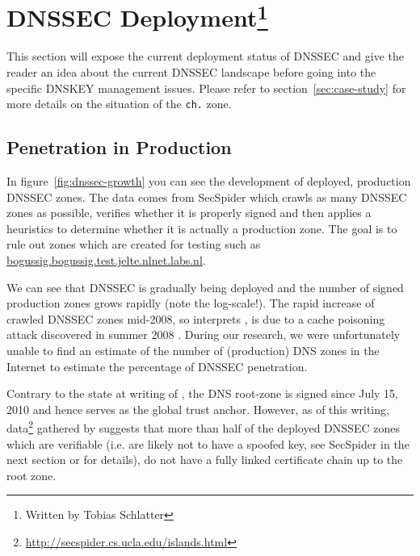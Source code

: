 \documentclass[a4paper,twocolumn]{scrartcl}
\newcommand{\wbts}{\protect\footnote{Written by Tobias Schlatter}}
\begin{document}
\section{DNSSEC Deployment\wbts}

This section will expose the current deployment status of DNSSEC and
give the reader an idea about the current DNSSEC landscape before
going into the specific DNSKEY management issues. Please refer to
section~\ref{sec:case-study} for more details on the situation of the
\verb|ch.| zone.

\subsection{Penetration in Production}
In figure~\ref{fig:dnssec-growth} you can see the development of
deployed, production DNSSEC zones. The data comes from SecSpider
\cite{secspider} which crawls as many DNSSEC zones as possible,
verifies whether it is properly signed and then applies a heuristics to
determine whether it is actually a production zone. The goal is to
rule out zones which are created for testing such as
\url{bogussig.bogussig.test.jelte.nlnet.labs.nl}.

We can see that DNSSEC is gradually being deployed and the number of
signed production zones grows rapidly (note the log-scale!). The rapid
increase of crawled DNSSEC zones mid-2008, so interprets
\cite{Osterweil09}, is due to a cache poisoning attack discovered in
summer 2008 \cite{dnsVuln}. During our research, we were unfortunately
unable to find an estimate of the number of (production) DNS zones in
the Internet to estimate the percentage of DNSSEC penetration.

Contrary to the state at writing of \cite{Osterweil09}, the DNS
root-zone is signed since July 15, 2010 \cite{root-dnssec} and hence
serves as the global trust anchor. However, as of this writing,
data\footnote{\url{http://secspider.cs.ucla.edu/islands.html}}
gathered by \cite{secspider} suggests that more than half of the
deployed DNSSEC zones which are verifiable (i.e. are likely not to
have a spoofed key, see SecSpider in the next section or
\cite{Osterweil09} for details), do not have a fully linked
certificate chain up to the root zone.
\end{document}

